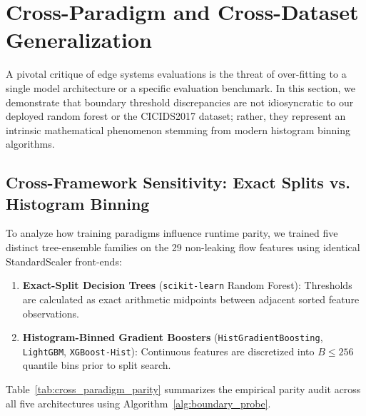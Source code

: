 \section{Cross-Paradigm and Cross-Dataset Generalization}
\label{sec:generalization}

A pivotal critique of edge systems evaluations is the threat of over-fitting to a single model architecture or a specific evaluation benchmark. In this section, we demonstrate that boundary threshold discrepancies are not idiosyncratic to our deployed random forest or the CICIDS2017 dataset; rather, they represent an intrinsic mathematical phenomenon stemming from modern histogram binning algorithms.

\subsection{Cross-Framework Sensitivity: Exact Splits vs. Histogram Binning}

To analyze how training paradigms influence runtime parity, we trained five distinct tree-ensemble families on the 29 non-leaking flow features using identical StandardScaler front-ends:
\begin{enumerate}
    \item \textbf{Exact-Split Decision Trees} (\texttt{scikit-learn} Random Forest): Thresholds are calculated as exact arithmetic midpoints between adjacent sorted feature observations.
    \item \textbf{Histogram-Binned Gradient Boosters} (\texttt{HistGradient}\allowbreak\texttt{Boosting}, \texttt{LightGBM}, \texttt{XGBoost-Hist}): Continuous features are discretized into $B \le 256$ quantile bins prior to split search.
\end{enumerate}

Table~\ref{tab:cross_paradigm_parity} summarizes the empirical parity audit across all five architectures using Algorithm~\ref{alg:boundary_probe}.

